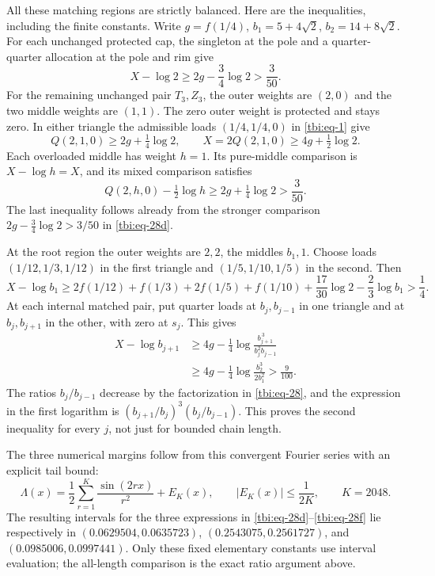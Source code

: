 All these matching regions are strictly balanced. Here are the inequalities, including the finite constants. Write \(g=f(1/4)\), \(b_1=5+4\sqrt2\), \(b_2=14+8\sqrt2\). For each unchanged protected cap, the singleton at the pole and a quarter-quarter allocation at the pole and rim give
\begin{equation}\label{tbi:eq-28d}
X-\log2\ge2g-\frac34\log2>\frac3{50}.
\end{equation}
For the remaining unchanged pair \(T_3,Z_3\), the outer weights are
\((2,0)\) and the two middle weights are \((1,1)\). The zero outer
weight is protected and stays zero. In either triangle the admissible
loads \((1/4,1/4,0)\) in \eqref{tbi:eq-1} give
\[
 Q(2,1,0)\ge2g+\tfrac14\log2,
 \qquad X=2Q(2,1,0)\ge4g+\tfrac12\log2.
\]
Each overloaded middle has weight \(h=1\). Its pure-middle comparison
is \(X-\log h=X\), and its mixed comparison satisfies
\[
 Q(2,h,0)-\tfrac12\log h
 \ge2g+\tfrac14\log2>\frac3{50}.
\]
The last inequality follows already from the stronger comparison
\(2g-\tfrac34\log2>3/50\) in \eqref{tbi:eq-28d}.

At the root region the outer weights are \(2,2\), the middles \(b_1,1\). Choose loads \((1/12,1/3,1/12)\) in the first triangle and \((1/5,1/10,1/5)\) in the second. Then
\begin{equation}\label{tbi:eq-28e}
X-\log b_1\ge
2f(1/12)+f(1/3)+2f(1/5)+f(1/10)
+\frac{17}{30}\log2-\frac23\log b_1>\frac14.
\end{equation}
At each internal matched pair, put quarter loads at \(b_j,b_{j-1}\) in one triangle and at \(b_j,b_{j+1}\) in the other, with zero at \(s_j\). This gives
\begin{equation}\label{tbi:eq-28f}
\begin{aligned}
X-\log b_{j+1}
&\ge4g-\frac14\log\frac{b_{j+1}^{\,3}}{b_j^2b_{j-1}}\\
&\ge4g-\frac14\log\frac{b_2^3}{2b_1^2}>\frac9{100}.
\end{aligned}
\end{equation}
The ratios \(b_j/b_{j-1}\) decrease by the factorization in \eqref{tbi:eq-28}, and the expression in the first logarithm is \((b_{j+1}/b_j)^3(b_j/b_{j-1})\). This proves the second inequality for every \(j\), not just for bounded chain length.

The three numerical margins follow from this convergent Fourier series
with an explicit tail bound:
\begin{equation}\label{tbi:eq-28g}
\Lambda(x)=\frac12\sum_{r=1}^{K}\frac{\sin(2rx)}{r^2}
+E_K(x),\qquad |E_K(x)|\le\frac1{2K},\qquad K=2048.
\end{equation}
The resulting intervals for the three expressions in \eqref{tbi:eq-28d}--\eqref{tbi:eq-28f} lie respectively in \((0.0629504,0.0635723)\), \((0.2543075,0.2561727)\), and \((0.0985006,0.0997441)\). Only these fixed elementary constants use interval evaluation; the all-length comparison is the exact ratio argument above.

